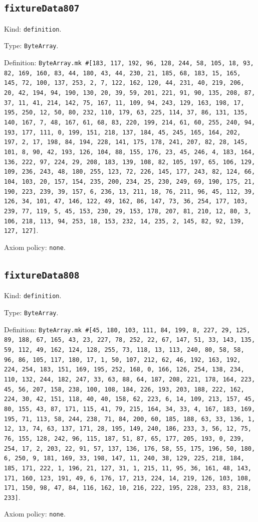 \documentclass[11pt]{article}
\begin{document}
\subsection*{\texttt{fixtureData807}}
\noindent Kind: \texttt{definition}.\par
\noindent Type: \texttt{ByteArray}.\par
\noindent Definition: \texttt{ByteArray.mk \#[183, 117, 192, 96, 128, 244, 58, 105, 18, 93, 82, 169, 160, 83, 44, 180, 43, 44, 230, 21, 185, 68, 183, 15, 165, 145, 72, 100, 137, 253, 2, 7, 122, 162, 120, 44, 231, 40, 219, 206, 20, 42, 194, 94, 190, 130, 20, 39, 59, 201, 221, 91, 90, 135, 208, 87, 37, 11, 41, 214, 142, 75, 167, 11, 109, 94, 243, 129, 163, 198, 17, 195, 250, 12, 50, 80, 232, 110, 179, 63, 225, 114, 37, 86, 131, 135, 140, 167, 7, 48, 167, 61, 68, 83, 220, 199, 214, 61, 60, 255, 240, 94, 193, 177, 111, 0, 199, 151, 218, 137, 184, 45, 245, 165, 164, 202, 197, 2, 17, 198, 84, 194, 228, 141, 175, 178, 241, 207, 82, 28, 145, 101, 8, 90, 42, 193, 126, 104, 88, 155, 176, 23, 45, 246, 4, 183, 164, 136, 222, 97, 224, 29, 208, 183, 139, 108, 82, 105, 197, 65, 106, 129, 109, 236, 243, 48, 180, 255, 123, 72, 226, 145, 177, 243, 82, 124, 66, 104, 103, 20, 157, 154, 235, 200, 234, 25, 230, 249, 69, 190, 175, 21, 190, 223, 239, 39, 157, 6, 236, 13, 211, 18, 76, 211, 96, 45, 112, 39, 126, 34, 101, 47, 146, 122, 49, 162, 86, 147, 73, 36, 254, 177, 103, 239, 77, 119, 5, 45, 153, 230, 29, 153, 178, 207, 81, 210, 12, 80, 3, 106, 218, 113, 94, 253, 18, 153, 232, 14, 235, 2, 145, 82, 92, 139, 127, 127]}.\par
\noindent Axiom policy: \texttt{none}.\par
\subsection*{\texttt{fixtureData808}}
\noindent Kind: \texttt{definition}.\par
\noindent Type: \texttt{ByteArray}.\par
\noindent Definition: \texttt{ByteArray.mk \#[45, 180, 103, 111, 84, 199, 8, 227, 29, 125, 89, 188, 67, 165, 43, 23, 227, 78, 252, 22, 67, 147, 51, 33, 143, 135, 59, 112, 49, 162, 124, 128, 255, 73, 118, 13, 113, 240, 80, 58, 58, 96, 86, 105, 117, 180, 17, 1, 50, 107, 212, 62, 46, 192, 163, 192, 224, 254, 183, 151, 169, 195, 252, 168, 0, 166, 126, 254, 138, 234, 110, 132, 244, 182, 247, 33, 63, 88, 64, 187, 208, 221, 178, 164, 223, 45, 56, 207, 158, 238, 100, 108, 184, 226, 193, 203, 188, 222, 162, 224, 30, 42, 151, 118, 40, 40, 158, 62, 223, 6, 14, 109, 213, 157, 45, 80, 155, 43, 87, 171, 115, 41, 79, 215, 164, 34, 33, 4, 167, 183, 169, 195, 71, 113, 58, 244, 238, 71, 84, 200, 60, 185, 188, 63, 33, 136, 1, 12, 13, 74, 63, 137, 171, 28, 195, 149, 240, 186, 233, 3, 56, 12, 75, 76, 155, 128, 242, 96, 115, 187, 51, 87, 65, 177, 205, 193, 0, 239, 254, 17, 2, 203, 22, 91, 57, 137, 136, 176, 58, 55, 175, 196, 50, 180, 6, 250, 9, 181, 169, 33, 198, 147, 11, 240, 38, 129, 225, 218, 184, 185, 171, 222, 1, 196, 21, 127, 31, 1, 215, 11, 95, 36, 161, 48, 143, 171, 160, 123, 191, 49, 6, 176, 17, 213, 224, 14, 219, 126, 103, 108, 171, 150, 98, 47, 84, 116, 162, 10, 216, 222, 195, 228, 233, 83, 218, 233]}.\par
\noindent Axiom policy: \texttt{none}.\par
\end{document}
